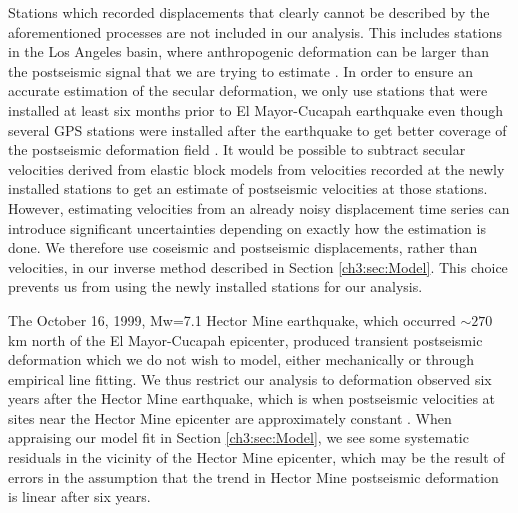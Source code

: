 Stations which recorded displacements that clearly cannot be described by the aforementioned processes are not included in our analysis. This includes stations in the Los Angeles basin, where anthropogenic deformation can be larger than the postseismic signal that we are trying to estimate \citep{Bawden2001,Argus2005}. In order to ensure an accurate estimation of the secular deformation, we only use stations that were installed at least six months prior to El Mayor-Cucapah earthquake even though several GPS stations were installed after the earthquake to get better coverage of the postseismic deformation field \citep{Spinler2015}.  It would be possible to subtract secular velocities derived from elastic block models \citep[e.g.][]{Meade2005} from velocities recorded at the newly installed stations to get an estimate of postseismic velocities at those stations. However, estimating velocities from an already noisy displacement time series can introduce significant uncertainties depending on exactly how the estimation is done.  We therefore use coseismic and postseismic displacements, rather than velocities, in our inverse method described in Section \ref{ch3:sec:Model}. This choice prevents us from using the newly installed stations for our analysis.   

The October 16, 1999, Mw=7.1 Hector Mine earthquake, which occurred ${\sim}270$ km north of the El Mayor-Cucapah epicenter, produced transient postseismic deformation which we do not wish to model, either mechanically or through empirical line fitting.  We thus restrict our analysis to deformation observed six years after the Hector Mine earthquake, which is when postseismic velocities at sites near the Hector Mine epicenter are approximately constant \citep{Savage2009}. When appraising our model fit in Section \ref{ch3:sec:Model}, we see some systematic residuals in the vicinity of the Hector Mine epicenter, which may be the result of errors in the assumption that the trend in Hector Mine postseismic deformation is linear after six years.   

